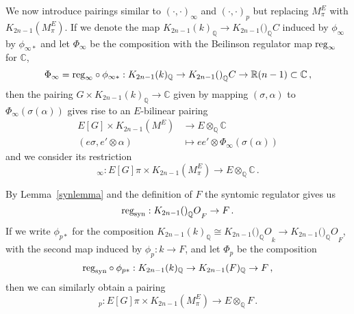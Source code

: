 \documentclass{amsart}
\begin{document}
We now introduce pairings similar to $ (\cdot,\cdot)_\infty $ and $
(\cdot,\cdot)_p $ but replacing $ M_\pi^E $ with $ {{K_{2n-1}(M_\pi^E)}} $.
If we denote the map $ {K_{2n-1}(k)_{\mathbb Q}}\to {K_{2n-1}({\mathbb)_{\mathbb Q}}C} $ induced by $ \phi_\infty $
by $ \phi_{\infty*} $ and let $ \Phi_\infty $
be the composition with the Beilinson regulator map $ {\textup{reg}}_\infty $ for $ {\mathbb C} $,
\begin{equation*}
\Phi_\infty = {\textup{reg}}_\infty \circ \phi_{\infty*} : {K_{2n-1}(k)_{\mathbb Q}}\to {K_{2n-1}({\mathbb)_{\mathbb Q}}C} \to {\mathbb R}(n-1) \subset {\mathbb C}
\,,
\end{equation*}
then the pairing $ G \times {K_{2n-1}(k)_{\mathbb Q}}\to {\mathbb C} $ given by mapping $ ({\sigma},{\alpha}) $ to $ \Phi_\infty({\sigma}({\alpha})) $ gives
rise to an $ E $-bilinear pairing
\begin{equation}\label{EKpairing}
\begin{aligned}
E[G] \times {{K_{2n-1}(M^E)}}& \to E \otimes_{\mathbb Q} {\mathbb C}
\\
(e{\sigma}, e' {\otimes} {\alpha} ) & \mapsto  e e' {\otimes} \Phi_\infty({\sigma}({\alpha}))
\end{aligned}
\end{equation}
and we consider its restriction
\begin{equation*}
[\,\cdot\,,\,\cdot\,]_\infty : E[G]\pi \times {{K_{2n-1}(M_\pi^E)}}\to E {\otimes}_{\mathbb Q} {\mathbb C}
\,.
\end{equation*}

By Lemma~\ref{synlemma} and the definition of $ F $ the syntomic regulator gives us
\begin{equation*}
{\textup{reg}}_{\textup{syn}} : {K_{2n-1}({{\mathcal)_{\mathbb Q}}O}_F} \to F
\,.
\end{equation*}
If we write $ \phi_{p*} $ for the composition $ {K_{2n-1}(k)_{\mathbb Q}}{\cong} {K_{2n-1}({{\mathcal)_{\mathbb Q}}O}_k} \to {K_{2n-1}({{\mathcal)_{\mathbb Q}}O}_F} $, with the second
map induced by $ \phi_p : k \to F $, and let $ \Phi_p $ be the composition
\begin{equation*}
{\textup{reg}}_{\textup{syn}} \circ \phi_{p*} : {K_{2n-1}(k)_{\mathbb Q}}\to {K_{2n-1}({F})_{\mathbb Q}}\to F
\,,
\end{equation*}
then we can similarly obtain a pairing
\begin{equation*}
[\,\cdot\,,\,\cdot\,]_p : E[G]\pi \times {{K_{2n-1}(M_\pi^E)}}\to E {\otimes}_{\mathbb Q} F
\,.
\end{equation*}
\end{document}
